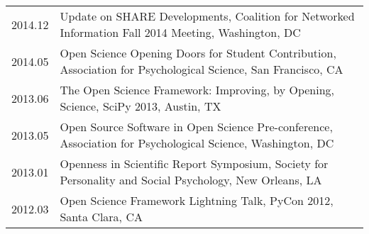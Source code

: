 \documentclass[11pt]{article}
\begin{document}
\begin{tabularx}{\textwidth}{lX}
    2014.12    & Update on SHARE Developments, Coalition for Networked Information Fall 2014 Meeting, Washington, DC\\
    2014.05    & Open Science Opening Doors for Student Contribution, Association for Psychological Science, San Francisco, CA\\
    2013.06    & The Open Science Framework: Improving, by Opening, Science, SciPy 2013, Austin, TX\\
    2013.05    & Open Source Software in Open Science Pre-conference, Association for Psychological Science, Washington, DC\\
    2013.01    & Openness in Scientific Report Symposium, Society for Personality and Social Psychology, New Orleans, LA\\
    2012.03    & Open Science Framework Lightning Talk, PyCon 2012, Santa Clara, CA\\
\end{tabularx}
\end{document}
